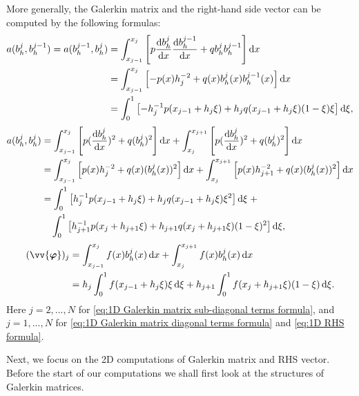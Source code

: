 	More generally, the Galerkin matrix and the right-hand side vector can be
	computed by the following formulas:
	\begin{equation}\label{eq:1D Galerkin matrix sub-diagonal terms formula}
	\begin{split}
	a(b_h^j,b_h^{j-1})=a(b_h^{j-1},b_h^j)
	&=\int_{x_{j-1}}^{x_j}\left[p\frac{\mathrm{d} b_h^j}{\mathrm{d} x}
		\frac{\mathrm{d} b_h^{j-1}}{\mathrm{d} x}+qb_h^j b_h^{j-1} \right]\mathrm{d} x\\
	&=\int_{x_{j-1}}^{x_j}\left[-p(x)h_j^{-2}+
		q(x)b_h^j(x)b_h^{j-1}(x)\right]\mathrm{d} x\\
	&=\int_{0}^{1}\left[-h_j^{-1}p(x_{j-1}+h_j\xi)+
		h_jq(x_{j-1}+h_j\xi) (1-\xi)\xi \right] \mathrm{d}\xi,
	\end{split}
	\end{equation}	
	\begin{equation}\label{eq:1D Galerkin matrix diagonal terms formula}
	\begin{split}
	a(b_h^j,b_h^j)
	&=\int_{x_{j-1}}^{x_j}\left[p(\frac{\mathrm{d} b_h^j}{\mathrm{d} x})^2+ 		
		q(b_h^j)^2\right]\mathrm{d} x +
	  \int_{x_j}^{x_{j+1}}\left[p(\frac{\mathrm{d} b_h^j}{\mathrm{d} x})^2+
	  	q(b_h^j)^2\right]\mathrm{d} x\\
	&=\int_{x_{j-1}}^{x_j}\left[p(x)h_j^{-2}+q(x)(b_h^j(x))^2\right]\mathrm{d} x+
	  \int_{x_j}^{x_{j+1}}\left[p(x)h_{j+1}^{-2}+q(x)(b_h^j(x))^2\right]\mathrm{d} x\\
	&=\int_{0}^{1}\left[h_j^{-1}p(x_{j-1}+h_j\xi)+
		h_jq(x_{j-1}+h_j\xi)\xi^2\right]\mathrm{d}\xi \; +\\
	  &\quad \int_{0}^{1}\left[h_{j+1}^{-1}p(x_j+h_{j+1}\xi)+
			h_{j+1}q(x_j+h_{j+1}\xi)(1-\xi)^2\right]\mathrm{d}\xi,				
	\end{split}
	\end{equation}
	\begin{equation}\label{eq:1D RHS formula}
	\begin{split}
	(\vv{\bm{\varphi}})_j
	&=\int_{x_{j-1}}^{x_j}f(x)b_h^j(x) \, \rd x+
		\int_{x_j}^{x_{j+1}}f(x)b_h^j(x) \, \rd x\\
	&=h_j\int_{0}^{1} f(x_{j-1}+h_j\xi)\xi \, \rd\xi+
	  	h_{j+1}\int_{0}^{1} f(x_j+h_{j+1}\xi)(1-\xi) \, \rd\xi.
	\end{split}
	\end{equation}
	Here $j=2,...,N$ for
	\eqref{eq:1D Galerkin matrix sub-diagonal terms formula}, 
	and $j=1,...,N$ for 
	\eqref{eq:1D Galerkin matrix diagonal terms formula} and
	\eqref{eq:1D RHS formula}.\vspace{8pt}
	
	Next, we focus on the 2D computations of Galerkin matrix and RHS vector.
	Before the start of our computations we shall first look at the structures
	of Galerkin matrices.
		
